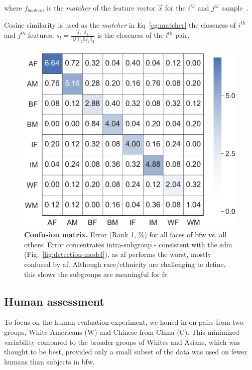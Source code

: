 where $f_{boolean}$ is the \textit{matcher} of the feature vector $\vec{x}$ for the $i^{th}$ and $j^{th}$ sample~\cite{LFWTech}.

Cosine similarity is used as the \emph{matcher} in Eq~\ref{eg:matcher} the closeness of $i^{th}$ and $j^{th}$ features, \ie
$
s_l= \frac{f_i\cdot f_j}{||f_i||_2||f_j||_2}
$ is the closeness of the $l^{th}$ pair. 

\begin{figure}[t!]
	\centering    
	\includegraphics[width=.75\linewidth]{figures/confusion.pdf}
		\caption{\small{\textbf{Confusion matrix.} Error (Rank 1, \%) for all faces of \gls{bfw} vs. all others. Error concentrates intra-subgroup - consistent with the \gls{sdm} (Fig.~\ref{fig:detection-model}), as \gls{af} performs the worst, mostly confused by \gls{af}. Although race/ethnicity are challenging to define, this shows the subgroups are meaningful for \gls{fr}.}}
		\label{fig:confusion} 
\end{figure} 

\subsection{Human assessment}\label{subsec:human-assessment}
To focus on the human evaluation experiment, we honed-in on pairs from two groups, White Americans (W) and Chinese from China (C). This minimized variability compared to the broader groups of Whites and Asians, which was thought to be best, provided only a small subset of the data was used on fewer humans than subjects in \gls{bfw}.


